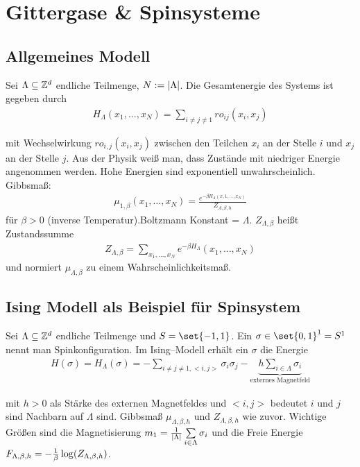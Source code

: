 
\chapter{Gittergase \& Spinsysteme}

\section{Allgemeines Modell}

Sei $\Lambda \subseteq \mathbb{Z}^d$ endliche Teilmenge, $N := \lvert\Lambda\rvert$. Die Gesamtenergie des Systems ist gegeben durch 
\begin{align}
	H_\Lambda (x_1, \dots, x_N) = \sum\limits_{i \neq j \neq 1} ro_{ij} (x_i,x_j)
\end{align}

mit Wechselwirkung $ro_{i,j}(x_i,x_j)$ zwischen den Teilchen $x_i$ an der Stelle $i$ und $x_j$ an der Stelle $j$. Aus der Physik weiß man, dass Zustände mit niedriger Energie angenommen werden. Hohe Energien sind exponentiell unwahrscheinlich. Gibbsmaß:
\begin{align}
	\mu_{1,\beta} (x_1, \dots, x_N) = \frac{e^{-\beta H_{\Lambda}(x,1,\dots, x_N)}}{Z_{\Lambda,\beta,h}}
\end{align}
für $\beta > 0$ (inverse Temperatur).Boltzmann Konstant = $\Lambda$. $Z_{\Lambda,\beta}$ heißt Zustandssumme 
\begin{align}
	Z_{\Lambda,\beta} = \sum\limits_{x_1,\dots,x_N} e^{-\beta H_{\Lambda}}(x_1,\dots, x_N)
\end{align}
und normiert $\mu_{\Lambda,\beta}$ zu einem Wahrscheinlichkeitsmaß.
 \section{Ising Modell als Beispiel für Spinsystem}
 Sei $\Lambda \subseteq \mathbb{Z}^d$ endliche Teilmenge und $S=\set{-1,1}$. Ein $\sigma \in \set{0,1}^1 = S^1$ nennt man Spinkonfiguration. Im Ising--Modell erhält ein $\sigma$ die Energie
 \begin{align}
 	H(\sigma) = H_{\Lambda} (\sigma) = - \sum\limits_{i \neq j \neq 1, <i,j>} \sigma_i \sigma_j - \underbrace{h \sum\limits_{i \in \Lambda} \sigma_i}_{\text{externes Magnetfeld}}
 \end{align} 
 
 mit $h>0$ als Stärke des externen Magnetfeldes und $<i,j>$ bedeutet $i$ und $j$ sind Nachbarn auf $\Lambda$ sind. Gibbsmaß $\mu_{\Lambda, \beta, h}$ und $Z_{\Lambda, \beta, h}$ wie zuvor.
 Wichtige Größen sind die Magnetisierung $m_1 = \frac{1}{\lvert\Lambda\rvert} \sum\limits_{i \in \Lambda} \sigma_i$ und die Freie Energie $F_{\Lambda, \beta, h} = -\frac{1}{\beta} \log \enb{Z_{\Lambda,\beta,h}}$.
 

